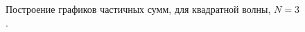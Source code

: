 \documentclass[a5paper, 10pt]{article}
\theoremstyle{definition}
\theoremstyle{plain}
\theoremstyle{remark}
\begin{document}
\begin{figure}[h]
\begin{minipage}[h]{0.5\linewidth}
\end{minipage}
\hfill
\begin{minipage}[h]{0.5\linewidth}
\end{minipage}
\caption{Построение графиков частичных сумм, для квадратной волны, $N=3$.}
\vfill


\end{figure}
\end{document}
